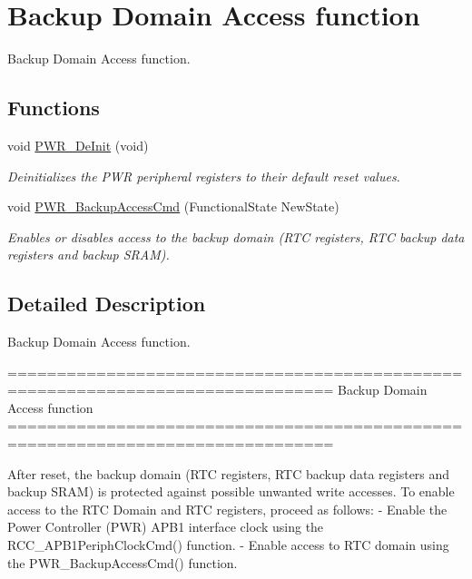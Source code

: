 \hypertarget{group___p_w_r___group1}{}\section{Backup Domain Access function}
\label{group___p_w_r___group1}


Backup Domain Access function.  


\subsection*{Functions}
\begin{DoxyCompactItemize}
\item 
void \hyperlink{group___p_w_r___group1_gad03a0aac7bc3bc3a9fd012f3769a6990}{P\+W\+R\+\_\+\+De\+Init} (void)
\begin{DoxyCompactList}\small\item\em Deinitializes the P\+W\+R peripheral registers to their default reset values. \end{DoxyCompactList}\item 
void \hyperlink{group___p_w_r___group1_ga0741aea35572b1a75f82b74de12df800}{P\+W\+R\+\_\+\+Backup\+Access\+Cmd} (Functional\+State New\+State)
\begin{DoxyCompactList}\small\item\em Enables or disables access to the backup domain (R\+T\+C registers, R\+T\+C backup data registers and backup S\+R\+A\+M). \end{DoxyCompactList}\end{DoxyCompactItemize}


\subsection{Detailed Description}
Backup Domain Access function. 

\begin{DoxyVerb} ===============================================================================
                            Backup Domain Access function 
 ===============================================================================  

  After reset, the backup domain (RTC registers, RTC backup data 
  registers and backup SRAM) is protected against possible unwanted 
  write accesses. 
  To enable access to the RTC Domain and RTC registers, proceed as follows:
    - Enable the Power Controller (PWR) APB1 interface clock using the
      RCC_APB1PeriphClockCmd() function.
    - Enable access to RTC domain using the PWR_BackupAccessCmd() function.\end{DoxyVerb}
 

